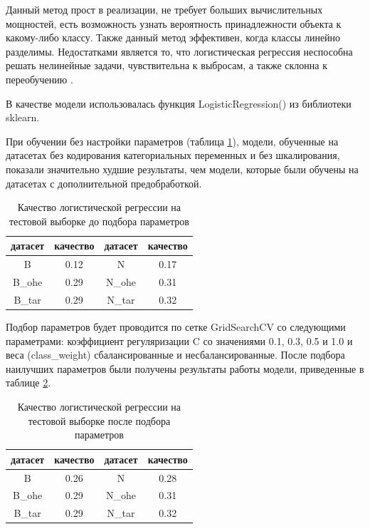 \documentclass[14pt]{mmcs_article}
\begin{document}
Данный метод прост в реализации, не требует больших вычислительных мощностей, есть возможность узнать вероятность принадлежности объекта к какому-либо классу. Также данный метод эффективен, когда классы линейно разделимы. Недостатками является то, что логистическая регрессия неспособна решать нелинейные задачи, чувствительна к выбросам, а также склонна к переобучению \cite{lib:logreg2}.

В качестве модели использовалась функция LogisticRegression() из библиотеки sklearn.

При обучении без настройки параметров (таблица \ref{models:table3}), модели, обученные на датасетах без кодирования категориальных переменных и без шкалирования, показали значительно худшие результаты, чем модели, которые были обучены на датасетах с дополнительной предобработкой.

\begin{table}[H]
	\centering
	\caption{Качество логистической регрессии на тестовой выборке до подбора параметров}\label{models:table3}
	\begin{tabular}{cccc}
		\hline
		датасет & качество	& датасет & качество \\
		\hline
		B &	0.12 &	N &	0.17 \\
		B\_ohe & 0.29 &	N\_ohe & 0.31\\
		B\_tar & 0.29 & N\_tar & 0.32 \\
		\hline
	\end{tabular}
\end{table}

Подбор параметров будет проводится по сетке GridSearchCV со следующими параметрами: коэффициент регуляризации C со значениями 0.1, 0.3, 0.5 и 1.0 и веса (class\_weight) сбалансированные и несбалансированные. После подбора наилучших параметров были получены результаты работы модели, приведенные в таблице \ref{models:table4}.

\begin{table}[H]
	\centering
\caption{Качество логистической регрессии на тестовой выборке после подбора параметров}\label{models:table4}
\begin{tabular}{cccc}
	\hline
	датасет & качество	& датасет & качество \\
	\hline
	B &	0.26 &	N &	0.28 \\
	B\_ohe & 0.29 &	N\_ohe & 0.31\\
	B\_tar & 0.29 & N\_tar & 0.32 \\
	\hline
\end{tabular}
\end{table}
\end{document}
